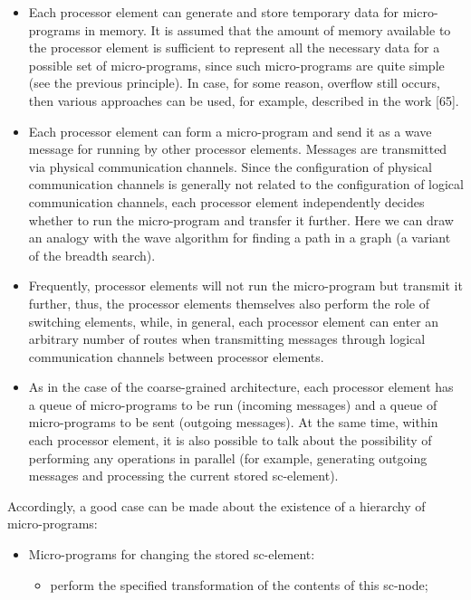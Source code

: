 \documentclass{article}
\begin{document}
\begin{multicols}{2}
\begin{itemize}
		\item Each processor element can generate and store temporary data for micro-programs in memory. It is assumed that the amount of memory available to the processor element is sufficient to represent all the necessary data for a possible set of micro-programs, since such micro-programs are quite simple (see the previous principle). In case, for some reason, overflow still occurs, then various approaches can be used, for example, described in the work [65].
		
		\item Each processor element can form a micro-program and send it as a wave message for running by other processor elements. Messages are transmitted via physical communication channels. Since the configuration of physical communication channels is generally not related to the configuration of logical communication channels, each processor element independently decides whether to run the micro-program and transfer it further. Here we can draw an analogy with the wave algorithm for finding a path in a graph (a variant of the breadth search).
		
		\item Frequently, processor elements will not run the micro-program but transmit it further, thus, the processor elements themselves also perform the role of switching elements, while, in general, each processor element can enter an arbitrary number of routes when transmitting messages through logical communication channels between processor elements.
		
		\item As in the case of the coarse-grained architecture, each processor element has a queue of micro-programs to be run (incoming messages) and a queue of micro-programs to be sent (outgoing messages). At the same time, within each processor element, it is also possible to talk about the possibility of performing any operations in parallel (for example, generating outgoing messages and processing the current stored sc-element).
	\end{itemize}

	Accordingly, a good case can be made about the existence of a hierarchy of micro-programs:
	
	\begin{itemize}
		\item Micro-programs for changing the stored sc-element:
		
		\begin{itemize}
			\item perform the specified transformation of the contents of this sc-node;
			

\end{itemize}
\end{itemize}
\end{multicols}
\end{document}
